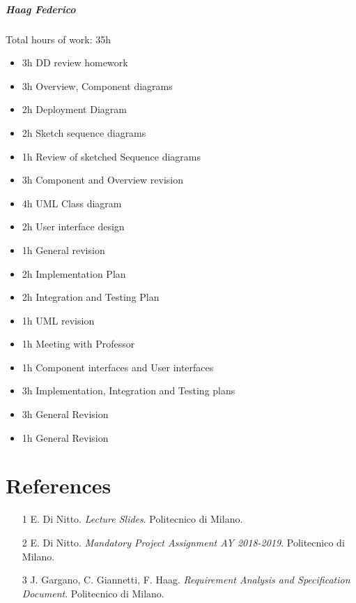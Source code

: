 \documentclass{report}
\newcommand{\ic}[1]{\textit{#1}}
\begin{document}
		\paragraph{Haag Federico} Total hours of work: 35h
			\begin{itemize}
				\item 3h DD review homework
				\item 3h Overview, Component diagrams
				\item 2h Deployment Diagram
				\item 2h Sketch sequence diagrams
				\item 1h Review of sketched Sequence diagrams
				\item 3h Component and Overview revision
				\item 4h UML Class diagram
				\item 2h User interface design
				\item 1h General revision
				\item 2h Implementation Plan
				\item 2h Integration and Testing Plan
				\item 1h UML revision
				\item 1h Meeting with Professor
				\item 1h Component interfaces and User interfaces
				\item 3h Implementation, Integration and Testing plans
				\item 3h General Revision
				\item 1h General Revision
			\end{itemize}
			
	\chapter{References}
	\thispagestyle{fancy}
	\begin{itemize}
		\item [1]\label{ref:1} E. Di Nitto. \ic{Lecture Slides}. Politecnico di Milano.
		\item [2]\label{ref:2} E. Di Nitto. \ic{Mandatory Project Assignment AY 2018-2019}. Politecnico di Milano.
		\item [3]\label{ref:3} J. Gargano, C. Giannetti, F. Haag. \ic{Requirement Analysis and Specification Document}. Politecnico di Milano.
	\end{itemize}
	
\end{document}
